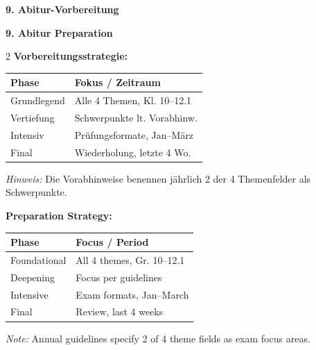 \documentclass[10pt,a4paper]{article}
\newcommand{\secbil}[2]{%
\vspace{8pt}
\noindent\colorbox{spanisch}{\parbox{0.48\textwidth}{\color{white}\bfseries #1}}%
\hfill%
\colorbox{english}{\parbox{0.48\textwidth}{\color{white}\bfseries #2}}
\vspace{4pt}
}
\begin{document}
\secbil{9. Abitur-Vorbereitung}{9. Abitur Preparation}

\vspace{2mm}

\begin{paracol}{2}
\small
\textbf{Vorbereitungsstrategie:}

\vspace{1mm}

\begin{tabular}{|l|l|}
\hline
\rowcolor{lightgray}
\textbf{Phase} & \textbf{Fokus / Zeitraum} \\
\hline
Grundlegend & Alle 4 Themen, Kl. 10--12.1 \\
\hline
Vertiefung & Schwerpunkte lt. Vorabhinw. \\
\hline
Intensiv & Prüfungsformate, Jan--März \\
\hline
Final & Wiederholung, letzte 4 Wo. \\
\hline
\end{tabular}

\vspace{2mm}
\textit{Hinweis:} Die Vorabhinweise benennen jährlich 2 der 4 Themenfelder als Schwerpunkte.

\switchcolumn

\small
\textcolor{english}{\textbf{Preparation Strategy:}}

\vspace{1mm}

\begin{tabular}{|l|l|}
\hline
\rowcolor{lightgray}
\textbf{Phase} & \textbf{Focus / Period} \\
\hline
Foundational & All 4 themes, Gr. 10--12.1 \\
\hline
Deepening & Focus per guidelines \\
\hline
Intensive & Exam formats, Jan--March \\
\hline
Final & Review, last 4 weeks \\
\hline
\end{tabular}

\vspace{2mm}
\textcolor{english}{\textit{Note:} Annual guidelines specify 2 of 4 theme fields as exam focus areas.}

\end{paracol}

\vspace{6mm}

\vspace{4mm}
\end{document}
